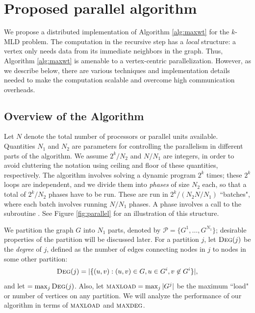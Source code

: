 \section{Proposed parallel algorithm}
\label{sec:proposed}
We propose a distributed implementation of Algorithm \ref{alg:maxwt} for the $k$-MLD problem. The computation in the recursive step has a \emph{local} structure: a vertex only needs data from its immediate neighbors in the graph. Thus, Algorithm \ref{alg:maxwt} is amenable to a vertex-centric parallelization. However, as we describe below, there are various techniques and implementation details needed to make the computation scalable and overcome high communication overheads.  


\subsection{Overview of the Algorithm \parmaxwt{}}
Let $N$ denote the total number of
processors or parallel units available. Quantities $N_1$ and $N_2$ are parameters for controlling the parallelism
in different parts of the algorithm.  
We assume $2^k/N_2$ and $N/N_1$ are integers, in order to avoid cluttering the
notation using ceiling and floor of these quantities, respectively.
The algorithm involves solving a dynamic program $2^k$ times; these $2^k$ loops are independent, and we divide them into \emph{phases} of size $N_2$ each, so that a total of $2^k/N_2$ phases have to be run. These are run in $2^k/(N_2N/N_1)$ ``batches", where each batch involves running $N/N_1$ phases. A phase involves a call to the subroutine \parcircuit{}.
See Figure \ref{fig:parallel} for an illustration of this structure.

We partition the graph $G$ into $N_1$ parts, denoted by
$\mathcal{P}=\{G^1, \ldots, G^{N_1}\}$; desirable properties of the partition will be discussed later. For a partition $j$, let $\textsc{Deg}(j)$ be the \emph{degree} of $j$, defined as the number of edges connecting nodes in $j$ to nodes in some other partition:
$$
\textsc{Deg}(j) = |\{(u, v): (u, v) \in G, u \in G^i, v \not \in G^i\}|,
$$
and let \maxdeg{} $ = \max_{j} \textsc{Deg}(j)$. Also, let $\textsc{maxload}{} = \max_j |G^j|$ be the maximum ``load" or number of vertices on any partition. We will analyze the performance of our algorithm in terms of $\textsc{maxload}{}$ and $\textsc{maxdeg}{}$.

